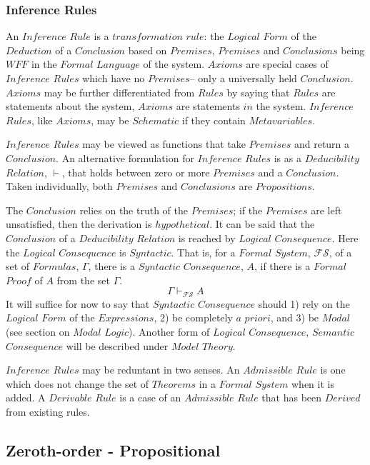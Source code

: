 \documentclass{article}
\begin{document}
\subsubsection{Inference Rules}

An $Inference$ $Rule$ is a $transformation$ $rule$: the $Logical$
$Form$ of the $Deduction$ of a $Conclusion$ based on $Premises$,
$Premises$ and $Conclusions$ being $WFF$ in the $Formal$ $Language$ of
the system. $Axioms$ are special cases of $Inference$ $Rules$ which
have no $Premises$-- only a universally held $Conclusion$. $Axioms$
may be further differentiated from $Rules$ by saying that $Rules$ are
statements about the system, $Axioms$ are statements $in$ the
system. $Inference$ $Rules$, like $Axioms$, may be $Schematic$ if they
contain $Metavariables$.

$Inference$ $Rules$ may be viewed as functions that take $Premises$
and return a $Conclusion$. An alternative formulation for $Inference$
$Rules$ is as a $Deducibility$ $Relation$, $\vdash$, that holds
between zero or more $Premises$ and a $Conclusion$. Taken
individually, both $Premises$ and $Conclusions$ are $Propositions$.

The $Conclusion$ relies on the truth of the $Premises$; if the
$Premises$ are left unsatisfied, then the derivation is
$hypothetical$. It can be said that the $Conclusion$ of a
$Deducibility$ $Relation$ is reached by $Logical$ $Consequence$. Here
the $Logical$ $Consequence$ is $Syntactic$. That is, for a $Formal$
$System$, $\mathcal{FS}$, of a set of $Formulas$, $\Gamma$, there is a
$Syntactic$ $Consequence$, $A$, if there is a $Formal$ $Proof$ of $A$
from the set $\Gamma$.
\[
    \Gamma \vdash_{\mathcal{FS}} A
\]
It will suffice for now to say that $Syntactic$ $Consequence$ should
1) rely on the $Logical$ $Form$ of the $Expressions$, 2) be completely
$a$ $priori$, and 3) be $Modal$ (see section on $Modal$
$Logic$). Another form of $Logical$ $Consequence$, $Semantic$
$Consequence$ will be described under $Model$ $Theory$.

$Inference$ $Rules$ may be reduntant in two senses. An $Admissible$
$Rule$ is one which does not change the set of $Theorems$ in a
$Formal$ $System$ when it is added. A $Derivable$ $Rule$ is a case of
an $Admissible$ $Rule$ that has been $Derived$ from existing rules.

\subsection{Zeroth-order - Propositional}
\end{document}

